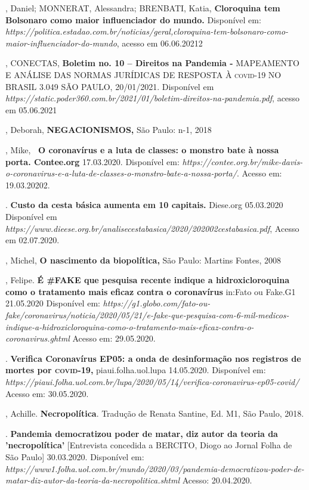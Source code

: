 \begin{bibliohedra}
, Daniel; MONNERAT, Alessandra; BRENBATI, Katia,
\textbf{Cloroquina tem Bolsonaro como maior influenciador do mundo.}
Disponível em:
\textit{https://politica.estadao.com.br/noticias/geral,cloroquina-tem-bolsonaro-como-maior-influenciador-do-mundo},
acesso em 06.06.20212

, CONECTAS, \textbf{Boletim no. 10 -- Direitos na Pandemia -}
MAPEAMENTO E ANÁLISE DAS NORMAS JURÍDICAS DE RESPOSTA À \textsc{covid-19} NO
BRASIL 3.049 SÃO PAULO, 20/01/2021. Disponível em
\textit{https://static.poder360.com.br/2021/01/boletim-direitos-na-pandemia.pdf},
acesso em 05.06.2021

, Deborah, \textbf{NEGACIONISMOS,} São Paulo: n-1, 2018

, Mike, \textbf{~O coronavírus e a luta de classes: o monstro bate
à nossa porta. Contee.org} 17.03.2020. Disponível em:
\textit{https://contee.org.br/mike-davis-o-coronavirus-e-a-luta-de-classes-o-monstro-bate-a-nossa-porta/}.
Acesso em: 19.03.20202.

. \textbf{Custo da cesta básica aumenta em 10 capitais.} Diese.org
05.03.2020 Disponível em
\textit{https://www.dieese.org.br/analisecestabasica/2020/202002cestabasica.pdf},
Acesso em 02.07.2020.

, Michel, \textbf{O nascimento da biopolítica,} São Paulo:
Martins Fontes, 2008

, Felipe. \textbf{É \#FAKE que pesquisa recente indique a
hidroxicloroquina como o tratamento mais eficaz contra o coronavírus}
in:Fato ou Fake.G1 21.05.2020 Disponível em:
\textit{https://g1.globo.com/fato-ou-fake/coronavirus/noticia/2020/05/21/e-fake-que-pesquisa-com-6-mil-medicos-indique-a-hidroxicloroquina-como-o-tratamento-mais-eficaz-contra-o-coronavirus.ghtml}
Acesso em: 29.05.2020.

. \textbf{Verifica Coronavírus EP05: a onda de desinformação nos
registros de mortes por \textsc{covid-19},} piaui.folha.uol.lupa 14.05.2020.
Disponível em:
\textit{https://piaui.folha.uol.com.br/lupa/2020/05/14/verifica-coronavirus-ep05-covid/}
Acesso em: 30.05.2020.

, Achille. \textbf{Necropolítica}. Tradução de Renata Santine, Ed.
M1, São Paulo, 2018.

\titidem. \textbf{Pandemia democratizou poder de matar, diz autor
da teoria da 'necropolítica'} {[}Entrevista concedida a BERCITO, Diogo
ao Jornal Folha de São Paulo{]} 30.03.2020. Disponível em:
\textit{https://www1.folha.uol.com.br/mundo/2020/03/pandemia-democratizou-poder-de-matar-diz-autor-da-teoria-da-necropolitica.shtml}
Acesso: 20.04.2020.


\end{bibliohedra}
